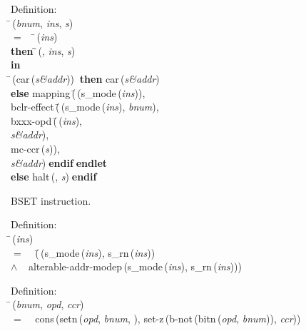\begin{tabbing}{\sc Definition}: \\  
\=\,({\it{bnum\/}}, {\it{ins\/}}, {\it{s\/}}) \\ 
$=$$\;\;\;\;$\=\,({\it{ins\/}}) \\ 
{\bf then }\=\=\,({}, {\it{ins\/}}, {\it{s\/}})\- \\ 
{\bf in} \\ 
\=\,({\rm{car}}\,({\it{s\&addr\/}}))$\;\;${\bf then }{\rm{car}}\,({\it{s\&addr\/}}) \\ 
{\bf else }{\rm{mapping}}\,(\=\,({\rm{s\_mode}}\,({\it{ins\/}})), \\ 
{\rm{bclr-effect}}\,(\=\,({\rm{s\_mode}}\,({\it{ins\/}}), {\it{bnum\/}}), \\ 
{\rm{bxxx-opd}}\,(\=\,({\it{ins\/}}), \\ 
{\it{s\&addr\/}})\-, \\ 
{\rm{mc-ccr}}\,({\it{s\/}}))\-, \\ 
{\it{s\&addr\/}})\-$\;${\bf  endif}\-$\;${\bf  endlet}\- \\ 
{\bf else }{\rm{halt}}\,({}, {\it{s\/}})$\;${\bf  endif}\-\-
\end{tabbing}

 BSET instruction.
\begin{tabbing}{\sc Definition}: \\  
\=\,({\it{ins\/}}) \\ 
$=$$\;\;\;\;$(\=\,({\rm{s\_mode}}\,({\it{ins\/}}), {\rm{s\_rn}}\,({\it{ins\/}})) \\ 
$\wedge$$\;\;\;\;${\rm{alterable-addr-modep}}\,({\rm{s\_mode}}\,({\it{ins\/}}), {\rm{s\_rn}}\,({\it{ins\/}})))\-\-
\end{tabbing}

\begin{tabbing}{\sc Definition}: \\  
\=\,({\it{bnum\/}}, {\it{opd\/}}, {\it{ccr\/}}) \\ 
$=$$\;\;\;\;${\rm{cons}}\,({\rm{setn}}\,({\it{opd\/}}, {\it{bnum\/}}, {}), {\rm{set-z}}\,({\rm{b-not}}\,({\rm{bitn}}\,({\it{opd\/}}, {\it{bnum\/}})), {\it{ccr\/}}))\-
\end{tabbing}

